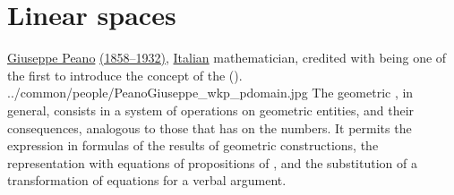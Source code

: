 \chapter{Linear spaces}
\qboxnpq
  {\href{http://en.wikipedia.org/wiki/Giuseppe_Peano}{Giuseppe Peano}
   \href{http://www-history.mcs.st-andrews.ac.uk/Timelines/TimelineF.html}{(1858--1932)},
   \href{http://www-history.mcs.st-andrews.ac.uk/BirthplaceMaps/Places/Italy.html}{Italian} mathematician,
   credited with being one of the first to introduce the concept of the  ().\footnotemark}
  {../common/people/PeanoGiuseppe_wkp_pdomain.jpg}
  {The geometric , in general, 
   consists in a system of operations on geometric entities, and their consequences, 
   analogous to those that  has on the numbers.
   It permits the expression in formulas of the results of geometric constructions,
   the representation with equations of propositions of ,
   and the substitution of a transformation of equations for a verbal argument.}


